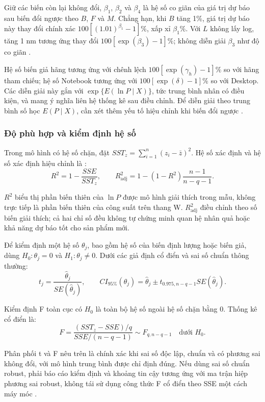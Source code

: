 Giữ các biến còn lại không đổi, \(\beta_1\), \(\beta_2\) và \(\beta_4\) là hệ số co giãn của giá trị dự báo sau biến đổi ngược theo \(B\), \(F\) và \(M\). Chẳng hạn, khi \(B\) tăng 1\%, giá trị dự báo này thay đổi chính xác \(100[(1.01)^{\beta_1}-1]\%\), xấp xỉ \(\beta_1\%\). Với \(L\) không lấy log, tăng 1 nm tương ứng thay đổi \(100[\exp(\beta_3)-1]\%\); không diễn giải \(\beta_3\) như độ co giãn \cite{ref14}.

Hệ số biến giả hãng tương ứng với chênh lệch \(100[\exp(\gamma_h)-1]\%\) so với hãng tham chiếu; hệ số Notebook tương ứng với \(100[\exp(\delta)-1]\%\) so với Desktop. Các diễn giải này gắn với \(\exp\{E(\ln P\mid X)\}\), tức trung bình nhân có điều kiện, và mang ý nghĩa liên hệ thống kê sau điều chỉnh. Để diễn giải theo trung bình số học \(E(P\mid X)\), cần xét thêm yếu tố hiệu chỉnh khi biến đổi ngược \cite{ref14}.

\subsubsection{Độ phù hợp và kiểm định hệ số}

Trong mô hình có hệ số chặn, đặt \(SST_z=\sum_{i=1}^{n}(z_i-\bar z)^2\). Hệ số xác định và hệ số xác định hiệu chỉnh là \cite{ref13}:
\nopagebreak[4]
\[R^2=1-\frac{SSE}{SST_z},\qquad
R^2_{\mathrm{adj}}=1-(1-R^2)\frac{n-1}{n-q-1}.\]

\(R^2\) biểu thị phần biến thiên của \(\ln P\) được mô hình giải thích trong mẫu, không trực tiếp là phần biến thiên của công suất trên thang W. \(R^2_{\mathrm{adj}}\) điều chỉnh theo số biến giải thích; cả hai chỉ số đều không tự chứng minh quan hệ nhân quả hoặc khả năng dự báo tốt cho sản phẩm mới.

Để kiểm định một hệ số \(\theta_j\), bao gồm hệ số của biến định lượng hoặc biến giả, dùng \(H_0:\theta_j=0\) và \(H_1:\theta_j\neq0\). Dưới các giả định cổ điển và sai số chuẩn thông thường:
\nopagebreak[4]
\[t_j=\frac{\hat\theta_j}{SE(\hat\theta_j)},\qquad
CI_{95\%}(\theta_j)=\hat\theta_j\pm t_{0.975,n-q-1}SE(\hat\theta_j).\]

Kiểm định F toàn cục có \(H_0\) là toàn bộ hệ số ngoài hệ số chặn bằng 0. Thống kê cổ điển là:
\nopagebreak[4]
\[F=\frac{(SST_z-SSE)/q}{SSE/(n-q-1)}\sim F_{q,n-q-1}\quad\text{dưới }H_0.\]

Phân phối t và F nêu trên là chính xác khi sai số độc lập, chuẩn và có phương sai không đổi, với mô hình trung bình được chỉ định đúng. Nếu dùng sai số chuẩn robust, phải báo cáo kiểm định và khoảng tin cậy tương ứng với ma trận hiệp phương sai robust, không tái sử dụng công thức F cổ điển theo SSE một cách máy móc \cite{ref13,ref18}.

